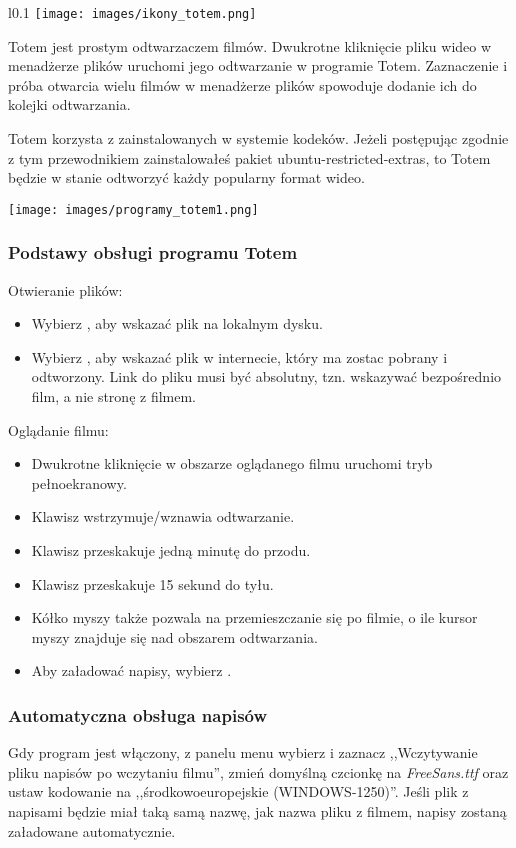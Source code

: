 \label{totem}\begin{wrapfigure}{l}{0.1\textwidth}
	\vspace{-10pt}
	\texttt{[image: images/ikony\_totem.png]}
\end{wrapfigure}

Totem jest prostym odtwarzaczem filmów. Dwukrotne kliknięcie pliku wideo w menadżerze plików uruchomi jego odtwarzanie w programie Totem. Zaznaczenie i próba otwarcia wielu filmów w menadżerze plików spowoduje dodanie ich do kolejki odtwarzania. 

Totem korzysta z zainstalowanych w systemie kodeków. Jeżeli postępując zgodnie z tym przewodnikiem zainstalowałeś pakiet \textcolor{ubuntu_orange}{ubuntu-restricted-extras}, to Totem będzie w stanie odtworzyć każdy popularny format wideo.
\begin{center}
	\texttt{[image: images/programy\_totem1.png]}
\end{center}

\subsubsection{Podstawy obsługi programu Totem}
Otwieranie plików:
\begin{itemize}
\item Wybierz , aby wskazać plik na lokalnym dysku.
\item Wybierz , aby wskazać plik w internecie, który ma zostac pobrany i odtworzony. Link do pliku musi być absolutny, tzn. wskazywać bezpośrednio film, a nie stronę z filmem.
\end{itemize}
Oglądanie filmu:
\begin{itemize}
\item Dwukrotne kliknięcie w obszarze oglądanego filmu uruchomi tryb pełnoekranowy.
\item Klawisz \keys{\Space} wstrzymuje/wznawia odtwarzanie.
\item Klawisz \keys{\arrowkeyright} przeskakuje jedną minutę do przodu.
\item Klawisz \keys{\arrowkeyleft} przeskakuje 15 sekund do tyłu.
\item Kółko myszy także pozwala na przemieszczanie się po filmie, o ile kursor myszy znajduje się nad obszarem odtwarzania.
\item Aby załadować napisy, wybierz .
\end{itemize}

\subsubsection{Automatyczna obsługa napisów}
Gdy program jest włączony, z panelu menu wybierz  i zaznacz ,,Wczytywanie pliku napisów po wczytaniu filmu'', zmień domyślną czcionkę na \textit{FreeSans.ttf} oraz ustaw kodowanie na ,,środkowoeuropejskie (WINDOWS-1250)''. Jeśli plik z napisami będzie miał taką samą nazwę, jak nazwa pliku z filmem, napisy zostaną załadowane automatycznie.
\clearpage
